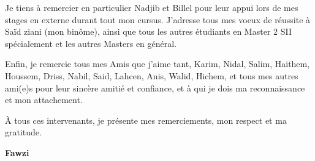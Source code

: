 Je tiens à  remercier en particulier Nadjib et Billel pour leur appui lors de mes stages en externe durant tout mon cursus.
J'adresse tous mes voeux de réussite à Saïd ziani (mon binôme), ainsi que tous les autres étudiants en Master 2 SII spécialement et les autres Masters en général.

Enfin, je remercie tous mes Amis que j’aime tant, Karim, Nidal, Salim, Haithem, Houssem, Driss, Nabil, Said, Lahcen, Anis, Walid, Hichem, et tous mes autres ami(e)s pour leur sincère amitié et confiance, et à qui je dois ma reconnaissance et mon attachement.

À tous ces intervenants, je présente mes remerciements, mon respect et ma gratitude.

\vspace{0.5cm}
\begin{center}
\Large
\hspace{12.5cm}
\textbf{Fawzi}
\end{center}